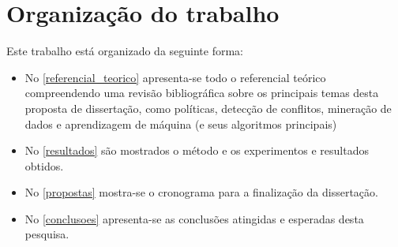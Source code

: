 \documentclass[
	12pt,				%
	openright,			%
	oneside,			%
	a4paper,			%
	english,			%
	french,				%
	spanish,			%
	brazil				%
	]{abntex2}
\begin{document}
\section{Organização do trabalho}
Este trabalho está organizado da seguinte forma:
\begin{itemize}	
	\item No \autoref{referencial_teorico} apresenta-se todo o referencial teórico compreendendo uma revisão bibliográfica sobre os principais temas desta proposta de dissertação, como políticas, detecção de conflitos, mineração de dados e aprendizagem de máquina (e seus algoritmos principais)
	\item No \autoref{resultados} são mostrados o método e os experimentos e resultados obtidos.
	\item No \autoref{propostas} mostra-se o cronograma para a finalização da dissertação.
	\item No \autoref{conclusoes} apresenta-se as conclusões atingidas e esperadas desta pesquisa.
\end{itemize}
\clearpage

%
%

%
%
%
\end{document}
